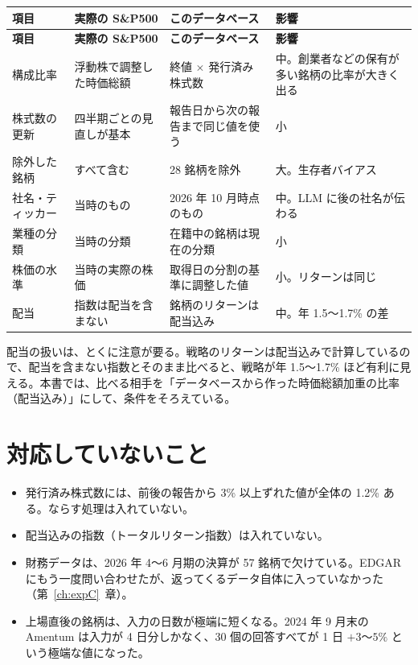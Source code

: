 \documentclass[xelatex,ja=standard,jafont=hiragino-pron,a4paper,10pt]{bxjsreport}
\newcommand{\SP}{S\&P500}
\newcommand{\chapref}[1]{第~\ref{#1}~章}
\begin{document}
\begin{longtable}{p{3.00cm}p{4.20cm}p{4.40cm}p{2.40cm}}
\toprule
\textbf{項目} & \textbf{実際の \SP{}} & \textbf{このデータベース} & \textbf{影響} \\
\midrule
\endfirsthead
\toprule
\textbf{項目} & \textbf{実際の \SP{}} & \textbf{このデータベース} & \textbf{影響} \\
\midrule
\endhead
\bottomrule
\endfoot
構成比率 & 浮動株で調整した時価総額 & 終値 $\times$ 発行済み株式数 & 中。創業者などの保有が多い銘柄の比率が大きく出る \\
株式数の更新 & 四半期ごとの見直しが基本 & 報告日から次の報告まで同じ値を使う & 小 \\
除外した銘柄 & すべて含む & 28 銘柄を除外 & 大。生存者バイアス \\
社名・ティッカー & 当時のもの & 2026 年 10 月時点のもの & 中。LLM に後の社名が伝わる \\
業種の分類 & 当時の分類 & 在籍中の銘柄は現在の分類 & 小 \\
株価の水準 & 当時の実際の株価 & 取得日の分割の基準に調整した値 & 小。リターンは同じ \\
配当 & 指数は配当を含まない & 銘柄のリターンは配当込み & 中。年 1.5〜1.7\% の差 \\
\end{longtable}

配当の扱いは、とくに注意が要る。戦略のリターンは配当込みで計算しているので、配当を含まない指数とそのまま比べると、戦略が年 1.5〜1.7\% ほど有利に見える。本書では、比べる相手を「データベースから作った時価総額加重の比率（配当込み）」にして、条件をそろえている。

\section{対応していないこと}

\begin{itemize}
\item 発行済み株式数には、前後の報告から 3\% 以上ずれた値が全体の 1.2\% ある。ならす処理は入れていない。
\item 配当込みの指数（トータルリターン指数）は入れていない。
\item 財務データは、2026 年 4〜6 月期の決算が 57 銘柄で欠けている。EDGAR にもう一度問い合わせたが、返ってくるデータ自体に入っていなかった（\chapref{ch:expC}）。
\item 上場直後の銘柄は、入力の日数が極端に短くなる。2024 年 9 月末の Amentum は入力が 4 日分しかなく、30 個の回答すべてが 1 日 $+3$〜$5\%$ という極端な値になった。
\end{itemize}
\end{document}
